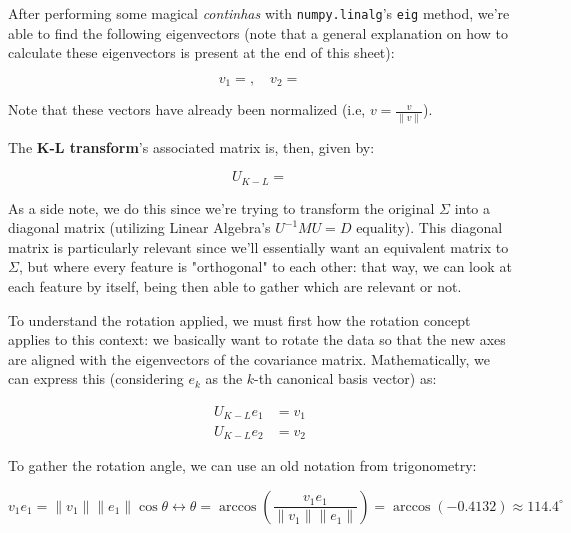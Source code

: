 \documentclass[12pt]{article}
\begin{document}
\begin{enumerate}[leftmargin=\labelsep]
  After performing some magical \textit{continhas} with \texttt{numpy.linalg}'s \texttt{eig}
  method, we're able to find the following eigenvectors (note that a general explanation
  on how to calculate these eigenvectors is present at the end of this sheet):

  \begin{equation*}
    v_1 = , \quad v_2 = 
  \end{equation*}

  Note that these vectors have already been normalized (i.e, $v = \frac{v}{\|v\|}$).

  The \textbf{K-L transform}'s associated matrix is, then, given by:

  \begin{equation*}
    U_{K-L} = 
  \end{equation*}

  As a side note, we do this since we're trying to transform the original
  $\Sigma$ into a diagonal matrix (utilizing Linear Algebra's $U^{-1} M U = D$ equality).
  This diagonal matrix is particularly relevant since we'll essentially
  want an equivalent matrix to $\Sigma$, but where every feature is "orthogonal"
  to each other: that way, we can look at each feature by itself,
  being then able to gather which are relevant or not.

  To understand the rotation applied, we must first how the rotation concept applies
  to this context: we basically want to rotate the data so that the new axes are
  aligned with the eigenvectors of the covariance matrix. Mathematically, we can
  express this (considering $e_k$ as the $k$-th canonical basis vector) as:

  \begin{equation*}
    \begin{aligned}
      U_{K-L} e_1 & = v_1 \\
      U_{K-L} e_2 & = v_2
    \end{aligned}
  \end{equation*}

  To gather the rotation angle, we can use an old notation from trigonometry:

  \begin{equation*}
    v_1 e_1 = \| v_1 \| \| e_1 \| \cos\theta \leftrightarrow
    \theta = \arccos\left(\frac{v_1 e_1}{\| v_1 \| \| e_1 \|}\right)
    = \arccos (-0.4132) \approx 114.4^\circ
  \end{equation*}


\end{enumerate}
\end{document}
